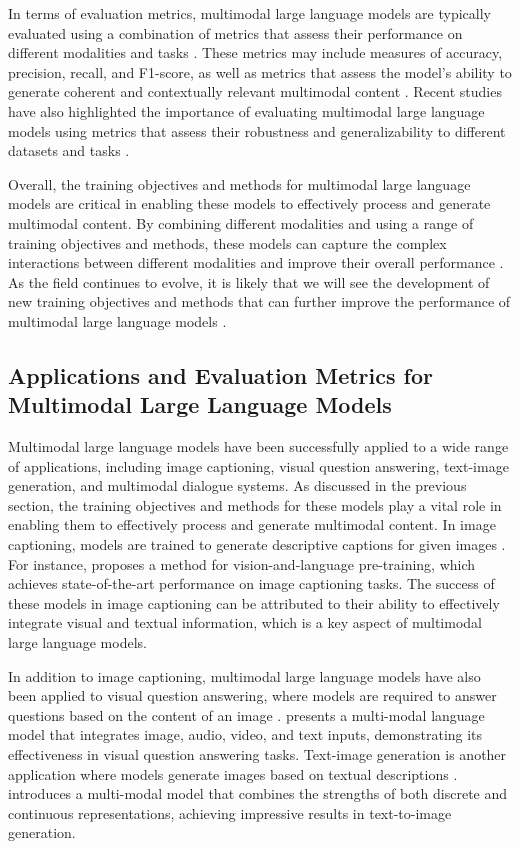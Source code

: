 \documentclass[11pt,a4paper]{article}
\begin{document}
In terms of evaluation metrics, multimodal large language models are typically evaluated using a combination of metrics that assess their performance on different modalities and tasks \cite{arxiv:2408.15998}. These metrics may include measures of accuracy, precision, recall, and F1-score, as well as metrics that assess the model's ability to generate coherent and contextually relevant multimodal content \cite{arxiv:2508.20279}. Recent studies have also highlighted the importance of evaluating multimodal large language models using metrics that assess their robustness and generalizability to different datasets and tasks \cite{arxiv:2503.02597}.

Overall, the training objectives and methods for multimodal large language models are critical in enabling these models to effectively process and generate multimodal content. By combining different modalities and using a range of training objectives and methods, these models can capture the complex interactions between different modalities and improve their overall performance \cite{arxiv:2506.16691}. As the field continues to evolve, it is likely that we will see the development of new training objectives and methods that can further improve the performance of multimodal large language models \cite{arxiv:2601.11464}.


\subsection{Applications and Evaluation Metrics for Multimodal Large Language Models}


Multimodal large language models have been successfully applied to a wide range of applications, including image captioning, visual question answering, text-image generation, and multimodal dialogue systems. As discussed in the previous section, the training objectives and methods for these models play a vital role in enabling them to effectively process and generate multimodal content. In image captioning, models are trained to generate descriptive captions for given images \cite{arxiv:1903.02930}. For instance, \cite{arxiv:2109.12178} proposes a method for vision-and-language pre-training, which achieves state-of-the-art performance on image captioning tasks. The success of these models in image captioning can be attributed to their ability to effectively integrate visual and textual information, which is a key aspect of multimodal large language models.

In addition to image captioning, multimodal large language models have also been applied to visual question answering, where models are required to answer questions based on the content of an image \cite{doi:10.1109/bigdata59044.2023.10386743}. \cite{arxiv:2306.09093} presents a multi-modal language model that integrates image, audio, video, and text inputs, demonstrating its effectiveness in visual question answering tasks. Text-image generation is another application where models generate images based on textual descriptions \cite{arxiv:2305.17216}. \cite{arxiv:2408.11039} introduces a multi-modal model that combines the strengths of both discrete and continuous representations, achieving impressive results in text-to-image generation.
\end{document}
